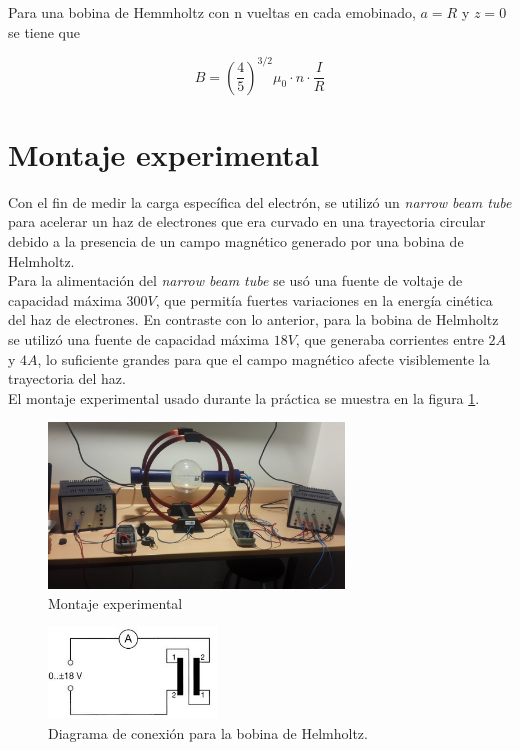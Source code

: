 \documentclass[prb,aps,twocolumn,preprintnumbers,amsmath,amssymb]{revtex4}
\begin{document}
Para una bobina de Hemmholtz con n vueltas en cada emobinado, $a = R$ y $z = 0$ se tiene que 

\begin{equation}
\label{campo helm.}
B = \left(\frac{4}{5}\right)^{3/2} \mu_{0}\cdot n\cdot \frac{I}{R}
\end{equation}

\section{Montaje experimental}

Con el fin de medir la carga específica del electrón, se utilizó un \textit{narrow beam tube} para acelerar un haz de electrones que era curvado en una trayectoria circular debido a la presencia de un campo magnético generado por una bobina de Helmholtz.\\

Para la alimentación del \textit{narrow beam tube} se usó una fuente de voltaje de capacidad máxima $300V$, que permitía fuertes variaciones en la energía cinética del haz de electrones. En contraste con lo anterior, para la bobina de Helmholtz se utilizó una fuente de capacidad máxima $18V$, que generaba corrientes entre $2A$ y $4A$, lo suficiente grandes para que el campo magnético afecte visiblemente la trayectoria del haz.\\

El montaje experimental usado durante la práctica se muestra en la figura \ref{fig:montaje}.

\begin{widetext}
	
	\begin{figure}[h!]
		\centering
		\includegraphics[width=0.7\textwidth]{carga-masa}
		\caption{Montaje experimental}
		\label{fig:montaje}
	\end{figure}
	
\end{widetext}

\begin{figure}[h!]
	\centering
	\includegraphics[width=0.4\textwidth,height=0.1\textheight]{helmholtz-coils}
	\caption{Diagrama de conexión para la bobina de Helmholtz.}
	\label{fig:coils}
\end{figure}
\end{document}
